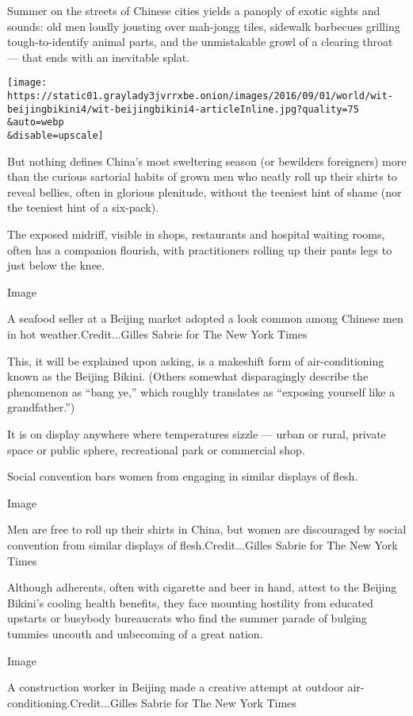 Summer on the streets of Chinese cities yields a panoply of exotic
sights and sounds: old men loudly jousting over mah-jongg tiles,
sidewalk barbecues grilling tough-to-identify animal parts, and the
unmistakable growl of a clearing throat --- that ends with an inevitable
splat.

\texttt{[image: https://static01.graylady3jvrrxbe.onion/images/2016/09/01/world/wit-beijingbikini4/wit-beijingbikini4-articleInline.jpg?quality=75\\\&auto=webp\\\&disable=upscale]}

But nothing defines China's most sweltering season (or bewilders
foreigners) more than the curious sartorial habits of grown men who
neatly roll up their shirts to reveal bellies, often in glorious
plenitude, without the teeniest hint of shame (nor the teeniest hint of
a six-pack).

The exposed midriff, visible in shops, restaurants and hospital waiting
rooms, often has a companion flourish, with practitioners rolling up
their pants legs to just below the knee.

Image

A seafood seller at a Beijing market adopted a look common among Chinese
men in hot weather.Credit...Gilles Sabrie for The New York Times

This, it will be explained upon asking, is a makeshift form of
air-conditioning known as the Beijing Bikini. (Others somewhat
disparagingly describe the phenomenon as ``bang ye,'' which roughly
translates as ``exposing yourself like a grandfather.'')

It is on display anywhere where temperatures sizzle --- urban or rural,
private space or public sphere, recreational park or commercial shop.

Social convention bars women from engaging in similar displays of flesh.

Image

Men are free to roll up their shirts in China, but women are discouraged
by social convention from similar displays of flesh.Credit...Gilles
Sabrie for The New York Times

Although adherents, often with cigarette and beer in hand, attest to the
Beijing Bikini's cooling health benefits, they face mounting hostility
from educated upstarts or busybody bureaucrats who find the summer
parade of bulging tummies uncouth and unbecoming of a great nation.

Image

A construction worker in Beijing made a creative attempt at outdoor
air-conditioning.Credit...Gilles Sabrie for The New York Times

